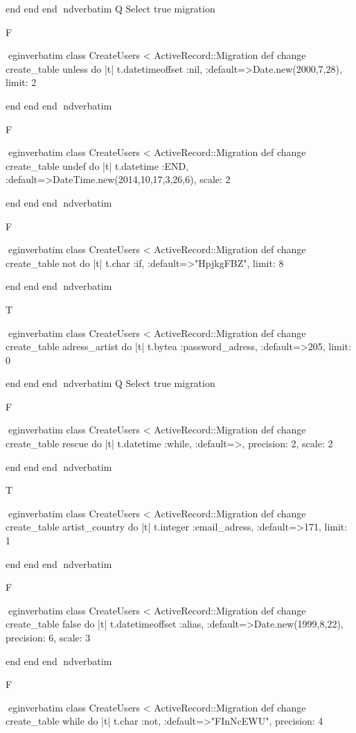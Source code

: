     end 
  end 
end
nd{verbatim}
Q
 Select true migration

F

egin{verbatim}
 class CreateUsers < ActiveRecord::Migration 
  def change 
    create_table unless do |t| 
      t.datetimeoffset :nil, :default=>Date.new(2000,7,28), limit: 2
    
    end 
  end 
end
nd{verbatim}

F

egin{verbatim}
 class CreateUsers < ActiveRecord::Migration 
  def change 
    create_table undef do |t| 
      t.datetime :END, :default=>DateTime.new(2014,10,17,3,26,6), scale: 2
    
    end 
  end 
end
nd{verbatim}

F

egin{verbatim}
 class CreateUsers < ActiveRecord::Migration 
  def change 
    create_table not do |t| 
      t.char :if, :default=>"HpjkgFBZ", limit: 8
    
    end 
  end 
end
nd{verbatim}

T

egin{verbatim}
 class CreateUsers < ActiveRecord::Migration 
  def change 
    create_table adress_artist do |t| 
      t.bytea :password_adress, :default=>205, limit: 0
    
    end 
  end 
end
nd{verbatim}
Q
 Select true migration

F

egin{verbatim}
 class CreateUsers < ActiveRecord::Migration 
  def change 
    create_table rescue do |t| 
      t.datetime :while, :default=>, precision: 2, scale: 2
    
    end 
  end 
end
nd{verbatim}

T

egin{verbatim}
 class CreateUsers < ActiveRecord::Migration 
  def change 
    create_table artist_country do |t| 
      t.integer :email_adress, :default=>171, limit: 1
    
    end 
  end 
end
nd{verbatim}

F

egin{verbatim}
 class CreateUsers < ActiveRecord::Migration 
  def change 
    create_table false do |t| 
      t.datetimeoffset :alias, :default=>Date.new(1999,8,22), precision: 6, scale: 3
    
    end 
  end 
end
nd{verbatim}

F

egin{verbatim}
 class CreateUsers < ActiveRecord::Migration 
  def change 
    create_table while do |t| 
      t.char :not, :default=>"FInNcEWU", precision: 4
    
